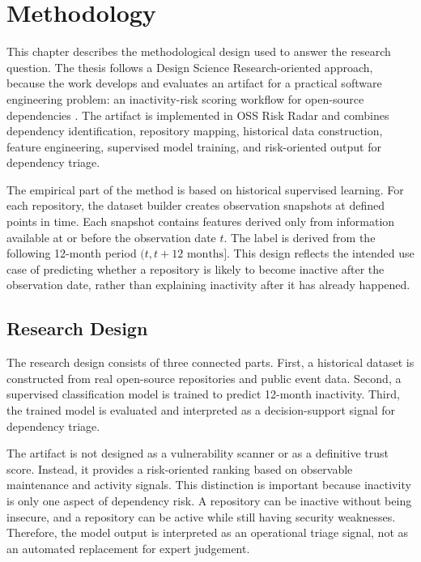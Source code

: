 \chapter{Methodology}
\label{chap:methodology}

This chapter describes the methodological design used to answer the research question. The thesis follows a Design Science Research-oriented approach, because the work develops and evaluates an artifact for a practical software engineering problem: an inactivity-risk scoring workflow for open-source dependencies \cite{hevner2004design,peffers2007design}. The artifact is implemented in OSS Risk Radar and combines dependency identification, repository mapping, historical data construction, feature engineering, supervised model training, and risk-oriented output for dependency triage.

The empirical part of the method is based on historical supervised learning. For each repository, the dataset builder creates observation snapshots at defined points in time. Each snapshot contains features derived only from information available at or before the observation date \(t\). The label is derived from the following 12-month period \((t, t + 12\text{ months}]\). This design reflects the intended use case of predicting whether a repository is likely to become inactive after the observation date, rather than explaining inactivity after it has already happened.

\section{Research Design}
\label{sec:method-research-design}

The research design consists of three connected parts. First, a historical dataset is constructed from real open-source repositories and public event data. Second, a supervised classification model is trained to predict 12-month inactivity. Third, the trained model is evaluated and interpreted as a decision-support signal for dependency triage.

The artifact is not designed as a vulnerability scanner or as a definitive trust score. Instead, it provides a risk-oriented ranking based on observable maintenance and activity signals. This distinction is important because inactivity is only one aspect of dependency risk. A repository can be inactive without being insecure, and a repository can be active while still having security weaknesses. Therefore, the model output is interpreted as an operational triage signal, not as an automated replacement for expert judgement.

